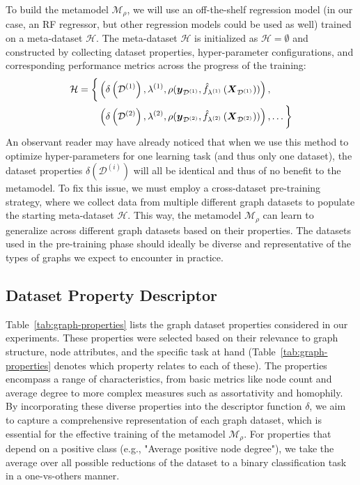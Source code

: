 To build the metamodel \( \mathcal{M}_\rho \), we will use an off-the-shelf regression model (in our case, an RF regressor, but other regression models could be used as well) trained on a meta-dataset \( \mathcal{H} \).
The meta-dataset \( \mathcal{H} \) is initialized as \( \mathcal{H} = \emptyset \) and constructed by collecting dataset properties, hyper-parameter configurations, and corresponding performance metrics across the progress of the training:
\begin{equation*}
	\begin{split}
		\mathcal{H} = \biggl\{ &\left( \delta \left( \mathcal{D}^{(1)} \right), \lambda^{(1)}, \rho( \boldsymbol{y}_{\mathcal{D}^{(1)}}, \hat{f}_{\lambda^{(1)}} \left( \boldsymbol{X}_{\mathcal{D}^{(1)}} \right) ) \right), \\
		&\left( \delta \left( \mathcal{D}^{(2)} \right), \lambda^{(2)}, \rho( \boldsymbol{y}_{\mathcal{D}^{(2)}}, \hat{f}_{\lambda^{(2)}} \left( \boldsymbol{X}_{\mathcal{D}^{(2)}} \right) ) \right), \dots \biggr\}
	\end{split}
\end{equation*}
An observant reader may have already noticed that when we use this method to optimize hyper-parameters for one learning task (and thus only one dataset), the dataset properties \( \delta \left( \mathcal{D}^{(i)} \right) \) will all be identical and thus of no benefit to the metamodel. To fix this issue, we must employ a cross-dataset pre-training strategy, where we collect data from multiple different graph datasets to populate the starting meta-dataset \( \mathcal{H} \). This way, the metamodel \( \mathcal{M}_\rho \) can learn to generalize across different graph datasets based on their properties. The datasets used in the pre-training phase should ideally be diverse and representative of the types of graphs we expect to encounter in practice.

\subsection{Dataset Property Descriptor}

Table~\ref{tab:graph-properties} lists the graph dataset properties considered in our experiments. These properties were selected based on their relevance to graph structure, node attributes, and the specific task at hand (Table~\ref{tab:graph-properties} denotes which property relates to each of these). The properties encompass a range of characteristics, from basic metrics like node count and average degree to more complex measures such as assortativity and homophily. By incorporating these diverse properties into the descriptor function \( \delta \), we aim to capture a comprehensive representation of each graph dataset, which is essential for the effective training of the metamodel \( \mathcal{M}_\rho \). For properties that depend on a positive class (e.g., "Average positive node degree"), we take the average over all possible reductions of the dataset to a binary classification task in a one-vs-others manner.

